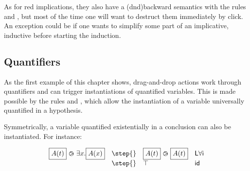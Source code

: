 

As for red implications, they also have a \kl(dnd){backward} semantics with the rules
 and , but most of the time one
will want to destruct them immediately by click. An exception could be if one
wants to simplify some part of an implicative, inductive  before starting
the induction.

\subsection{Quantifiers}
As the first example of this chapter shows, drag-and-drop actions work through
quantifiers and can trigger instantiations of quantified variables. This is made
possible by the rules  and , which allow the
instantiation of a variable universally quantified in a hypothesis.

Symmetrically, a variable quantified existentially in a conclusion can
also be instantiated. For instance:

$$\begin{array}{llll}
    \select{A(t)}\back \exists x.\select{A(x)}&\step{}&
                                                      \select{A(t)}\back\select{A(t)}&\mathsf{L}\forall\mathsf{i}
    \\
                                               &\step{}& \top&\mathsf{id}
  \end{array}
  $$

